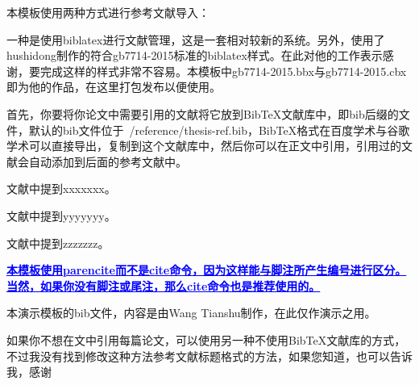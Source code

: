 \par 本模板使用两种方式进行参考文献导入：

\par 一种是使用biblatex进行文献管理，这是一套相对较新的系统。另外，使用了hushidong制作的符合gb7714-2015标准的biblatex样式。在此对他的工作表示感谢，要完成这样的样式非常不容易。本模板中gb7714-2015.bbx与gb7714-2015.cbx即为他的作品，在这里打包发布以便使用。

\par 首先，你要将你论文中需要引用的文献将它放到BibTeX文献库中，即bib后缀的文件，默认的bib文件位于~/reference/thesis-ref.bib，BibTeX格式在百度学术与谷歌学术可以直接导出，复制到这个文献库中，然后你可以在正文中引用，引用过的文献会自动添加到后面的参考文献中。


\par 文献\parencite{Yang_Hy200215}中提到xxxxxxx。  %
\par 文献\parencite{Joa1999}中提到yyyyyyy。
\par 文献\parencite{Altman1997}中提到zzzzzzz。
\par \textcolor{blue}{\textbf{\uline{本模板使用parencite而不是cite命令，因为这样能与脚注所产生编号进行区分。当然，如果你没有脚注或尾注，那么cite命令也是推荐使用的。}}}

\par 本演示模板的bib文件，内容是由Wang Tianshu制作，在此仅作演示之用。


\par 如果你不想在文中引用每篇论文，可以使用另一种不使用BibTeX文献库的方式，不过我没有找到修改这种方法参考文献标题格式的方法，如果您知道，也可以告诉我，感谢

